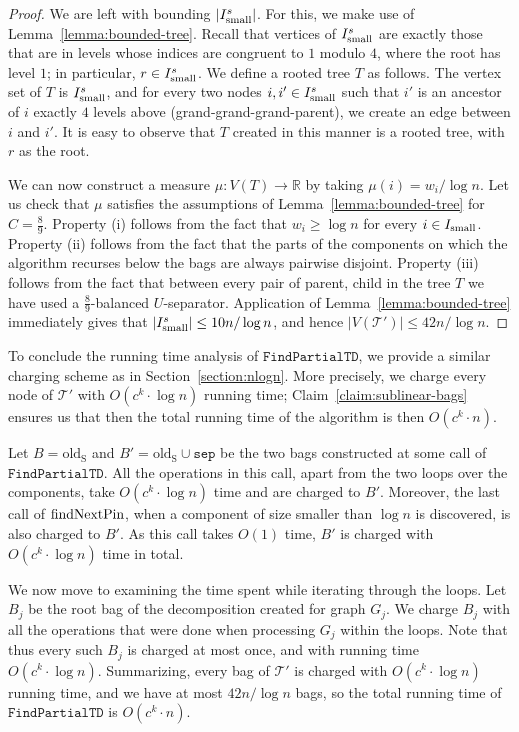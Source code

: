 \documentclass[a4paper,11pt]{article}
\theoremstyle{definition}
\theoremstyle{remark}
\newcommand{\findPTD}{\mathtt{FindPartialTD}}
\newcommand{\oldS}{\mathrm{old_S}}
\newcommand{\sep}{\mathtt{sep}}
\newcommand{\qpin}{\textnormal{findNextPin}}
\newcommand{\td}{\mathcal{T}} \newcommand{\tw}{\mathrm{tw}} \newcommand{\w}{\mathrm{w}}
\newcommand{\R}{\mathbb{R}}
\begin{document}
\begin{proof}
  We are left with bounding $|I_{\textrm{small}}^{s}|$.  For this, we make use of
  Lemma~\ref{lemma:bounded-tree}.  Recall that vertices of $I_{\textrm{small}}^{s}$
  are exactly those that are in levels whose indices are congruent to
  $1$ modulo $4$, where the root has level $1$; in particular, $r\in
  I_{\textrm{small}}^{s}$.  We define a rooted tree $T$ as follows.  The vertex set
  of $T$ is $I_{\textrm{small}}^{s}$, and for every two nodes $i,i'\in I^s_{\textrm{small}}$
  such that $i'$ is an ancestor of $i$ exactly $4$ levels above
  (grand-grand-grand-parent), we create an edge between $i$ and $i'$.
  It is easy to observe that $T$ created in this manner is a rooted
  tree, with $r$ as the root.
  
  We can now construct a measure $\mu:V(T)\to \R$ by taking
  $\mu(i)=w_i/\log n$.  Let us check that $\mu$ satisfies the
  assumptions of Lemma~\ref{lemma:bounded-tree} for $C=\frac{8}{9}$.
  Property (i) follows from the fact that $w_i\geq \log n$ for every
  $i\in I_{\textrm{small}}$.  Property (ii) follows from the fact that the parts of
  the components on which the algorithm recurses below the bags are
  always pairwise disjoint.  Property (iii) follows from the fact that
  between every pair of parent, child in the tree $T$ we have used a
  $\frac{8}{9}$-balanced $U$-separator.  Application of
  Lemma~\ref{lemma:bounded-tree} immediately gives that $|I_{\textrm{small}}^s|\leq
  10 n/\log n$, and hence $|V(\td')|\leq 42 n/\log n$.
\end{proof}

To conclude the running time analysis of $\findPTD$, we provide a
similar charging scheme as in Section~\ref{section:nlogn}.  More
precisely, we charge every node of $\td'$ with $O(c^k\cdot \log n)$
running time; Claim~\ref{claim:sublinear-bags} ensures us that then
the total running time of the algorithm is then $O(c^k\cdot n)$.

Let $B=\oldS$ and $B'=\oldS\cup \sep$ be the two bags constructed at some
call of $\findPTD$.  All the operations in this call, apart from the
two loops over the components, take $O(c^k\cdot \log n)$ time and are
charged to $B'$.  Moreover, the last call of $\qpin$, when a component
of size smaller than $\log n$ is discovered, is also charged to $B'$.
As this call takes $O(1)$ time, $B'$ is charged with $O(c^k\cdot \log
n)$ time in total.

We now move to examining the time spent while iterating through the
loops.  Let $B_j$ be the root bag of the decomposition created for
graph $G_j$.  We charge $B_j$ with all the operations that were done
when processing $G_j$ within the loops.  Note that thus every such
$B_j$ is charged at most once, and with running time $O(c^k\cdot \log
n)$.  Summarizing, every bag of $\td'$ is charged with $O(c^k\cdot
\log n)$ running time, and we have at most $42 n/\log n$ bags, so the
total running time of $\findPTD$ is $O(c^k\cdot n)$.
\end{document}
